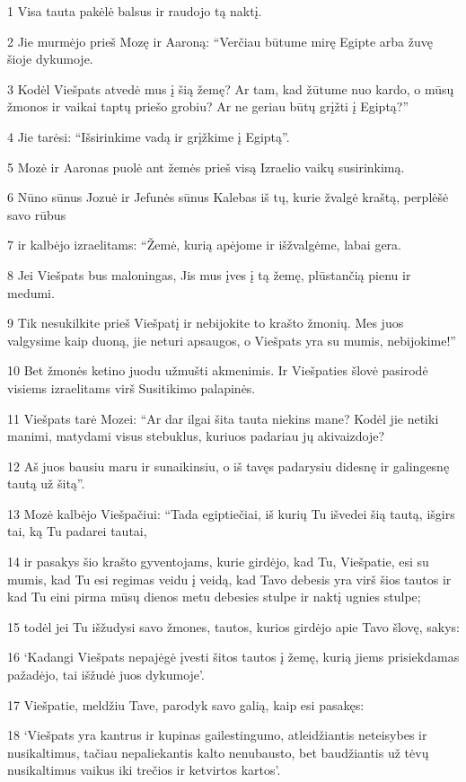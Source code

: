 \par 1 Visa tauta pakėlė balsus ir raudojo tą naktį. 
\par 2 Jie murmėjo prieš Mozę ir Aaroną: “Verčiau būtume mirę Egipte arba žuvę šioje dykumoje. 
\par 3 Kodėl Viešpats atvedė mus į šią žemę? Ar tam, kad žūtume nuo kardo, o mūsų žmonos ir vaikai taptų priešo grobiu? Ar ne geriau būtų grįžti į Egiptą?” 
\par 4 Jie tarėsi: “Išsirinkime vadą ir grįžkime į Egiptą”. 
\par 5 Mozė ir Aaronas puolė ant žemės prieš visą Izraelio vaikų susirinkimą. 
\par 6 Nūno sūnus Jozuė ir Jefunės sūnus Kalebas iš tų, kurie žvalgė kraštą, perplėšė savo rūbus 
\par 7 ir kalbėjo izraelitams: “Žemė, kurią apėjome ir išžvalgėme, labai gera. 
\par 8 Jei Viešpats bus maloningas, Jis mus įves į tą žemę, plūstančią pienu ir medumi. 
\par 9 Tik nesukilkite prieš Viešpatį ir nebijokite to krašto žmonių. Mes juos valgysime kaip duoną, jie neturi apsaugos, o Viešpats yra su mumis, nebijokime!” 
\par 10 Bet žmonės ketino juodu užmušti akmenimis. Ir Viešpaties šlovė pasirodė visiems izraelitams virš Susitikimo palapinės. 
\par 11 Viešpats tarė Mozei: “Ar dar ilgai šita tauta niekins mane? Kodėl jie netiki manimi, matydami visus stebuklus, kuriuos padariau jų akivaizdoje? 
\par 12 Aš juos bausiu maru ir sunaikinsiu, o iš tavęs padarysiu didesnę ir galingesnę tautą už šitą”. 
\par 13 Mozė kalbėjo Viešpačiui: “Tada egiptiečiai, iš kurių Tu išvedei šią tautą, išgirs tai, ką Tu padarei tautai, 
\par 14 ir pasakys šio krašto gyventojams, kurie girdėjo, kad Tu, Viešpatie, esi su mumis, kad Tu esi regimas veidu į veidą, kad Tavo debesis yra virš šios tautos ir kad Tu eini pirma mūsų dienos metu debesies stulpe ir naktį­ ugnies stulpe; 
\par 15 todėl jei Tu išžudysi savo žmones, tautos, kurios girdėjo apie Tavo šlovę, sakys: 
\par 16 ‘Kadangi Viešpats nepajėgė įvesti šitos tautos į žemę, kurią jiems prisiekdamas pažadėjo, tai išžudė juos dykumoje’. 
\par 17 Viešpatie, meldžiu Tave, parodyk savo galią, kaip esi pasakęs: 
\par 18 ‘Viešpats yra kantrus ir kupinas gailestingumo, atleidžiantis neteisybes ir nusikaltimus, tačiau nepaliekantis kalto nenubausto, bet baudžiantis už tėvų nusikaltimus vaikus iki trečios ir ketvirtos kartos’. 
